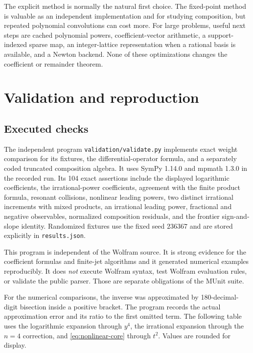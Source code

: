 \documentclass[11pt,a4paper]{article}
\numberwithin{equation}{section}
\theoremstyle{definition}\newtheorem{definition}[theorem]{Definition}
\theoremstyle{remark}\newtheorem{remark}[theorem]{Remark}
\newcommand{\code}[1]{\texttt{#1}}
\begin{document}
The explicit method is normally the natural first choice. The fixed-point
method is valuable as an independent implementation and for studying
composition, but repeated polynomial convolutions can cost more. For
large problems, useful next steps are cached polynomial powers,
coefficient-vector arithmetic, a support-indexed sparse map, an
integer-lattice representation when a rational basis is available, and a
Newton backend. None of these optimizations changes the coefficient or
remainder theorem.

\section{Validation and reproduction}
\label{sec:validation}

\subsection{Executed checks}

The independent program \code{validation/validate.py} implements exact
weight comparison for its fixtures, the differential-operator formula,
and a separately coded truncated composition algebra. It uses SymPy
1.14.0 and mpmath 1.3.0 in the recorded run. Its 104 exact assertions
include the displayed logarithmic coefficients, the irrational-power
coefficients, agreement with the finite product formula, resonant
collisions, nonlinear leading powers, two distinct irrational
increments with mixed products, an irrational leading power, fractional
and negative observables, normalized composition residuals, and the
frontier sign-and-slope identity. Randomized fixtures use the fixed seed
$236367$ and are stored explicitly in \code{results.json}.

This program is independent of the Wolfram source. It is strong evidence
for the coefficient formulas and finite-jet algorithms and it generated
numerical examples reproducibly. It does \emph{not} execute Wolfram
syntax, test Wolfram evaluation rules, or validate the public parser.
Those are separate obligations of the MUnit suite.

For the numerical comparisons, the inverse was approximated by
180-decimal-digit bisection inside a positive bracket. The program
records the actual approximation error and its ratio to the first
omitted term. The following table uses the logarithmic expansion through
$y^4$, the irrational expansion through the $n=4$ correction, and
\cref{eq:nonlinear-core} through $t^2$. Values are rounded for display.

\end{document}
